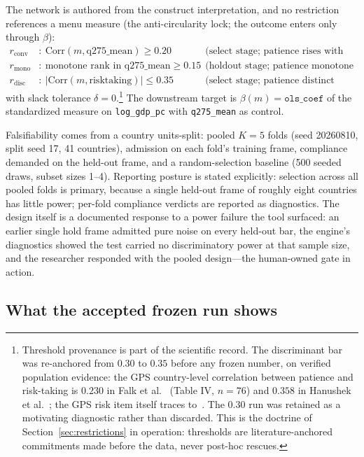 \documentclass[10pt,letterpaper]{article}
\begin{document}
The network is authored from the construct interpretation, and no restriction references a menu measure (the anti-circularity lock; the outcome enters only through $\beta$):
\begin{align}
r_{\mathrm{conv}}&:\ \mathrm{Corr}(m,\mathrm{q275\_mean})\ge 0.20
  &&\text{(select stage; patience rises with education)}\\
r_{\mathrm{mono}}&:\ \text{monotone rank in }\mathrm{q275\_mean}\ge 0.15
  &&\text{(holdout stage; patience monotone in education)}\\
r_{\mathrm{disc}}&:\ \bigl|\mathrm{Corr}(m,\mathrm{risktaking})\bigr|\le 0.35
  &&\text{(select stage; patience distinct from risk preference)}
\end{align}
with slack tolerance $\delta=0$.\footnote{Threshold provenance is part of the scientific record. The discriminant bar was re-anchored from $0.30$ to $0.35$ before any frozen number, on verified population evidence: the GPS country-level correlation between patience and risk-taking is $0.230$ in Falk et al.~\cite{falk2018} (Table IV, $n=76$) and $0.358$ in Hanushek et al.~\cite{hanushek2022}; the GPS risk item itself traces to~\cite{dohmen2011}. The $0.30$ run was retained as a motivating diagnostic rather than discarded. This is the doctrine of Section~\ref{sec:restrictions} in operation: thresholds are literature-anchored commitments made before the data, never post-hoc rescues.}
The downstream target is $\beta(m)=\texttt{ols\_coef}$ of the standardized measure on \texttt{log\_gdp\_pc} with \texttt{q275\_mean} as control.

Falsifiability comes from a country units-split: pooled $K{=}5$ folds (seed 20260810, split seed 17, 41 countries), admission on each fold's training frame, compliance demanded on the held-out frame, and a random-selection baseline (500 seeded draws, subset sizes 1--4).
Reporting posture is stated explicitly: selection across all pooled folds is primary, because a single held-out frame of roughly eight countries has little power; per-fold compliance verdicts are reported as diagnostics.
The design itself is a documented response to a power failure the tool surfaced: an earlier single hold frame admitted pure noise on every held-out bar, the engine's diagnostics showed the test carried no discriminatory power at that sample size, and the researcher responded with the pooled design---the human-owned gate in action.

\subsection{What the accepted frozen run shows}
\label{sec:app-results}
\end{document}
